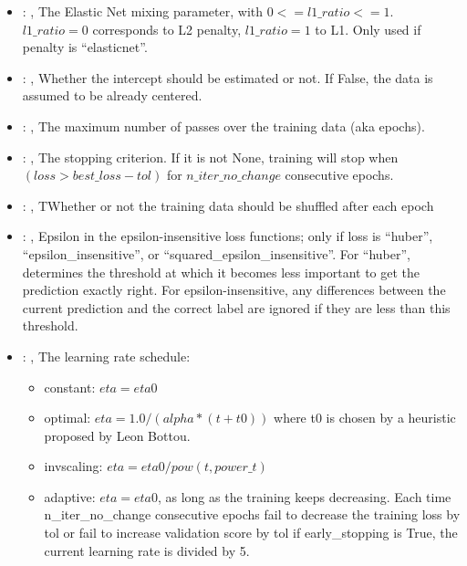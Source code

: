 \begin{itemize}
    \item {}: , 
      The Elastic Net mixing parameter, with $0 <= l1\_ratio <= 1$. $l1\_ratio=0$ corresponds to L2
      penalty, $l1\_ratio=1$ to L1.                                                  Only used if
      penalty is ``elasticnet''.

    \item {}: , 
      Whether the intercept should be estimated or not. If False,
      the data is assumed to be already centered.

    \item {}: , 
      The maximum number of passes over the training data (aka epochs).

    \item {}: , 
      The stopping criterion. If it is not None, training will stop when $(loss > best\_loss - tol)$
      for $n\_iter\_no\_change$                                                  consecutive epochs.

    \item {}: , 
      TWhether or not the training data should be shuffled after each epoch

    \item {}: , 
      Epsilon in the epsilon-insensitive loss functions; only if loss is ``huber'',
      ``epsilon\_insensitive'', or
      ``squared\_epsilon\_insensitive''. For ``huber'', determines the threshold at which it becomes
      less important to get the                                                  prediction exactly
      right. For epsilon-insensitive, any differences between the current prediction and the correct
      label                                                  are ignored if they are less than this
      threshold.

    \item {}: , 
      The learning rate schedule:                                                  \begin{itemize}
      \item constant: $eta = eta0$                                                   \item optimal:
      $eta = 1.0 / (alpha * (t + t0))$ where t0 is chosen by a heuristic proposed by Leon Bottou.
      \item invscaling: $eta = eta0 / pow(t, power\_t)$
      \item adaptive: $eta = eta0$, as long as the training keeps decreasing. Each time
      n\_iter\_no\_change consecutive epochs fail
      to decrease the training loss by tol or fail to increase validation score by tol if
      early\_stopping is True, the current
      learning rate is divided by 5.                                                  \end{itemize}


\end{itemize}
